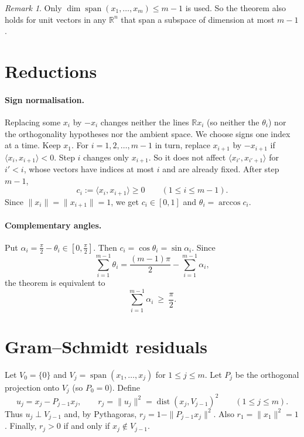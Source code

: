 \documentclass[11pt]{article}
\theoremstyle{remark}
\newtheorem{remark}[theorem]{Remark}
\theoremstyle{definition}
\newcommand{\ip}[2]{\langle #1,#2\rangle}
\begin{document}
\begin{remark}
Only $\dim\operatorname{span}(x_1,\dots,x_m)\le m-1$ is used. So the theorem also holds for unit
vectors in any $\mathbb{R}^n$ that span a subspace of dimension at most $m-1$.
\end{remark}

\section{Reductions}

\paragraph{Sign normalisation.}
Replacing some $x_i$ by $-x_i$ changes neither the lines $\mathbb{R}x_i$ (so neither the $\theta_i$)
nor the orthogonality hypotheses nor the ambient space. We choose signs one index at a time.
Keep $x_1$. For $i=1,2,\dots,m-1$ in turn, replace $x_{i+1}$ by $-x_{i+1}$ if
$\ip{x_i}{x_{i+1}}<0$. Step $i$ changes only $x_{i+1}$. So it does not affect
$\ip{x_{i'}}{x_{i'+1}}$ for $i'<i$, whose vectors have indices at most $i$ and are already fixed.
After step $m-1$,
\[
  c_i:=\ip{x_i}{x_{i+1}}\ge0\qquad(1\le i\le m-1).
\]
Since $\|x_i\|=\|x_{i+1}\|=1$, we get $c_i\in[0,1]$ and $\theta_i=\arccos c_i$.

\paragraph{Complementary angles.}
Put $\alpha_i=\frac\pi2-\theta_i\in[0,\frac\pi2]$. Then $c_i=\cos\theta_i=\sin\alpha_i$. Since
\[
  \sum_{i=1}^{m-1}\theta_i=\frac{(m-1)\pi}{2}-\sum_{i=1}^{m-1}\alpha_i,
\]
the theorem is equivalent to
\begin{equation}\label{eq:goal}
  \sum_{i=1}^{m-1}\alpha_i\ \ge\ \frac\pi2 .
\end{equation}

\section{Gram--Schmidt residuals}

Let $V_0=\{0\}$ and $V_j=\operatorname{span}(x_1,\dots,x_j)$ for $1\le j\le m$. Let $P_j$ be the orthogonal
projection onto $V_j$ (so $P_0=0$). Define
\[
  u_j=x_j-P_{j-1}x_j,\qquad r_j=\|u_j\|^2=\operatorname{dist}(x_j,V_{j-1})^2\qquad(1\le j\le m).
\]
Thus $u_j\perp V_{j-1}$ and, by Pythagoras, $r_j=1-\|P_{j-1}x_j\|^2$. Also $r_1=\|x_1\|^2=1$.
Finally, $r_j>0$ if and only if $x_j\notin V_{j-1}$.
\end{document}
